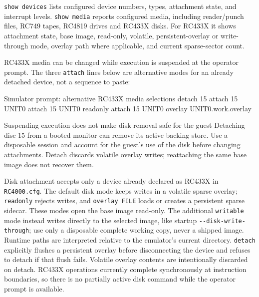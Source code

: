 \passthrough{\lstinline!show devices!} lists configured device numbers, types, attachment state, and interrupt levels. \passthrough{\lstinline!show media!} reports configured media, including reader/punch files, RC749 tapes, RC4819 drives and RC433X disks. For RC433X it shows attachment state, base image, read-only, volatile, persistent-overlay or write-through mode, overlay path where applicable, and current sparse-sector count.

RC433X media can be changed while execution is suspended at the operator prompt. The three \passthrough{\lstinline!attach!} lines below are alternative modes for an already detached device, not a sequence to paste:

\begin{commandexample}{Simulator prompt: alternative RC433X media selections}
detach 15
attach 15 UNIT0
attach 15 UNIT0 readonly
attach 15 UNIT0 overlay UNIT0.work.overlay
\end{commandexample}

\begin{operationnote}{Suspending execution does not make disk removal safe for the guest}
Detaching disc 15 from a booted monitor can remove its active backing store. Use a disposable session and account for the guest's use of the disk before changing attachments. Detach discards volatile overlay writes; reattaching the same base image does not recover them.
\end{operationnote}

Disk attachment accepts only a device already declared as RC433X in \passthrough{\lstinline!RC4000.cfg!}. The default disk mode keeps writes in a volatile sparse overlay; \passthrough{\lstinline!readonly!} rejects writes, and \passthrough{\lstinline!overlay FILE!} loads or creates a persistent sparse sidecar. These modes open the base image read-only. The additional \passthrough{\lstinline!writable!} mode instead writes directly to the selected image, like startup \passthrough{\lstinline!--disk-write-through!}; use only a disposable complete working copy, never a shipped image. Runtime paths are interpreted relative to the emulator's current directory. \passthrough{\lstinline!detach!} explicitly flushes a persistent overlay before disconnecting the device and refuses to detach if that flush fails. Volatile overlay contents are intentionally discarded on detach. RC433X operations currently complete synchronously at instruction boundaries, so there is no partially active disk command while the operator prompt is available.
